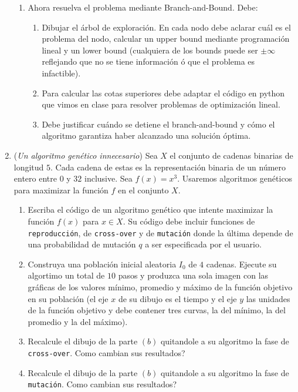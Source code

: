 \documentclass[12pt, a4paper]{article}
\begin{document}
\begin{enumerate}
\begin{enumerate}
\item Ahora resuelva el problema mediante Branch-and-Bound. Debe:
\begin{enumerate}
\item Dibujar el árbol de exploración. En cada nodo debe aclarar cuál es el problema del nodo, calcular un upper bound mediante programación lineal y un lower bound (cualquiera de los bounds puede ser $\pm \infty$ reflejando que no se tiene información ó que el problema es infactible). 
\item Para calcular las cotas superiores debe adaptar el código en python que vimos en clase para resolver problemas de optimización lineal.
\item Debe justificar cuándo se detiene el branch-and-bound y cómo el algoritmo garantiza haber alcanzado una solución óptima.

\end{enumerate}

 
\end{enumerate}






\item ({\it Un algoritmo genético innecesario}) Sea $X$ el conjunto de cadenas binarias de longitud $5$. Cada cadena de estas es la representación binaria de un número entero entre $0$ y $32$ inclusive. Sea $f(x)=x^3$. Usaremos algoritmos genéticos para maximizar la función $f$ en el conjunto $X$.
\begin{enumerate}
\item Escriba el código de un algoritmo genético que intente maximizar la función $f(x)$ para $x\in X$. Su código debe incluir funciones de \verb!reproducción!, de \verb!cross-over! y de \verb!mutación! donde la última depende de una probabilidad de mutación $q$ a ser especificada por el usuario.  

\item Construya una población inicial aleatoria $I_0$ de $4$ cadenas. Ejecute su algortimo un total de $10$ pasos y produzca una sola imagen con las gráficas de los valores mínimo, promedio y máximo de la función objetivo en su población (el eje $x$ de su dibujo es el tiempo y el eje $y$ las unidades de la función objetivo y debe contener tres curvas, la del mínimo, la del promedio y la del máximo).

\item Recalcule el dibujo de la parte $(b)$ quitandole a su algoritmo la fase de \verb!cross-over!. Como cambian sus resultados?

\item Recalcule el dibujo de la parte $(b)$ quitandole a su algoritmo la fase de \verb!mutación!. Como cambian sus resultados?

\end{enumerate}
 
\end{enumerate}
\end{document}
